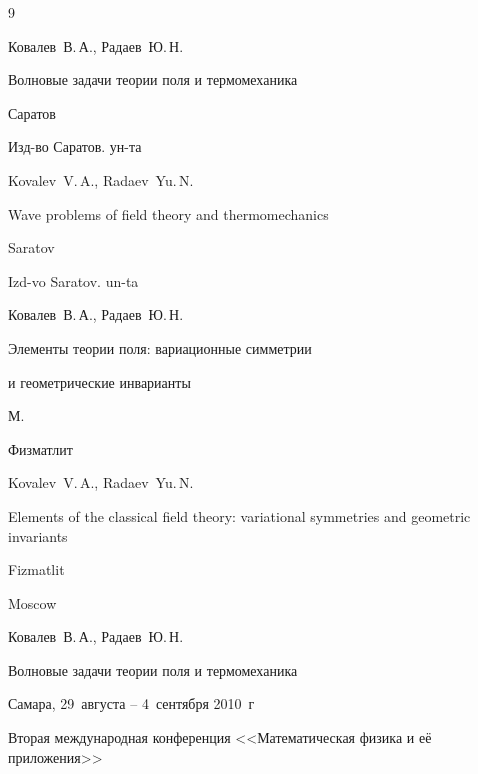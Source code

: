 \begin{thebibliography}{9}




\by Ковалев~В.\,А., Радаев~Ю.\,Н.

\book Волновые задачи теории поля и термомеханика

\publaddr Саратов

\publ Изд-во Саратов. ун-та



\misctransl

\by Kovalev~V.\,A., Radaev~Yu.\,N.

\book Wave problems of field theory and thermomechanics 

\publaddr Saratov

\publ Izd-vo Saratov. un-ta








\by Ковалев~В.\,А., Радаев~Ю.\,Н.

\book Элементы теории поля: вариационные симметрии

и геометрические инварианты

\publaddr М.

\publ Физматлит



\misctransl

\by Kovalev~V.\,A., Radaev~Yu.\,N.

\book Elements of the classical field theory: variational symmetries and geometric invariants

\publ Fizmatlit

\publaddr Moscow






\by Ковалев~В.\,А., Радаев~Ю.\,Н.

\paper Волновые задачи теории поля и термомеханика

\procinfo Самара, 29~августа -- 4~сентября 2010~г

\inbook Вторая международная конференция <<Математическая физика и её приложения>>


\end{thebibliography}
